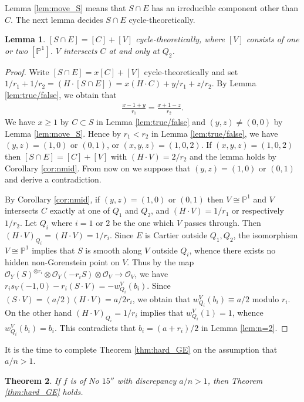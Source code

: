 \documentclass[a4paper,11pt]{amsart}
\newtheorem{theorem}{Theorem}[section]
\newtheorem{lemma}[theorem]{Lemma}
\theoremstyle{definition}
\theoremstyle{remark}
\numberwithin{equation}{section}
\newcommand{\bP}{{\mathbb P}}
\newcommand{\cO}{{\mathcal O}}
\begin{document}
Lemma \ref{lem:move_S} means that
$S \cap E$ has an irreducible component other than $C$.
The next lemma decides $S \cap E$ cycle-theoretically.

\begin{lemma}\label{lem:cycle_S}
$[S \cap E]=[C]+[V]$ cycle-theoretically,
where $[V]$ consists of one or two $[\bP^1]$.
$V$ intersects $C$ at and only at $Q_2$.
\end{lemma}

\begin{proof}
Write $[S \cap E]=x[C]+[V]$ cycle-theoretically
and set $1/r_1+1/r_2=(H \cdot [S \cap E])=x(H \cdot C)+y/r_1+z/r_2$.
By Lemma \ref{lem:true/false}, we obtain that
\begin{align*}
\frac{x-1+y}{r_1}=\frac{x+1-z}{r_2}.
\end{align*}
We have $x \ge 1$ by $C \subset S$ in Lemma \ref{lem:true/false}
and $(y,z)\neq(0,0)$ by Lemma \ref{lem:move_S}.
Hence by $r_1<r_2$ in Lemma \ref{lem:true/false},
we have $(y,z)=(1,0)$ or $(0,1)$, or $(x,y,z)=(1,0,2)$.
If $(x,y,z)=(1,0,2)$ then $[S \cap E]=[C]+[V]$ with $(H \cdot V)=2/r_2$
and the lemma holds by Corollary \ref{cor:nmid}.
From now on we suppose that $(y,z)=(1,0)$ or $(0,1)$
and derive a contradiction.

By Corollary \ref{cor:nmid},
if $(y,z)=(1,0)$ or $(0,1)$ then
$V \cong \bP^1$ and $V$ intersects $C$ exactly at one of $Q_1$ and $Q_2$,
and $(H \cdot V)=1/r_1$ or respectively $1/r_2$.
Let $Q_i$ where $i=1$ or $2$ be the one which $V$ passes through.
Then $(H \cdot V)_{Q_i}=(H \cdot V)=1/r_i$.
Since $E$ is Cartier outside $Q_1,Q_2$,
the isomorphism $V \cong \bP^1$ implies that
$S$ is smooth along $V$ outside $Q_i$,
whence there exists no hidden non-Gorenstein point on $V$.
Thus by the map
$\cO_Y(S)^{\otimes r_i} \otimes \cO_Y(-r_iS) \otimes \cO_V \to \cO_V$,
we have $r_is_V(-1,0)-r_i(S \cdot V)=-w_{Q_i}^V(b_i)$.
Since $(S \cdot V)=(a/2)(H \cdot V)=a/2r_i$,
we obtain that $w_{Q_i}^V(b_i)\equiv a/2$ modulo $r_i$.
On the other hand $(H \cdot V)_{Q_i}=1/r_i$ implies that $w_{Q_i}^V(1)=1$,
whence $w_{Q_i}^V(b_i)=b_i$.
This contradicts that $b_i=(a+r_i)/2$ in Lemma \ref{lem:n=2}.
\end{proof}

It is the time to complete Theorem \ref{thm:hard_GE}
on the assumption that $a/n>1$.

\begin{theorem}\label{thm:hard_GE15}
If $f$ is of No $\textrm{15}''$ with discrepancy $a/n>1$,
then Theorem \textup{\ref{thm:hard_GE}} holds.
\end{theorem}
\end{document}
